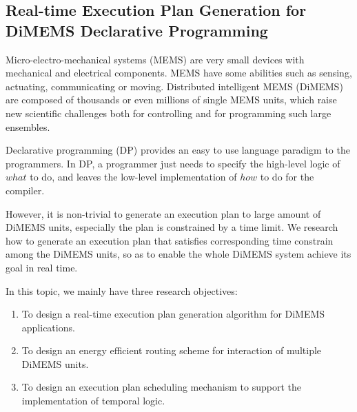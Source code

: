 
\subsection{Real-time Execution Plan Generation for DiMEMS Declarative Programming}

Micro-electro-mechanical systems (MEMS) are very small devices with mechanical and electrical components. MEMS have some abilities such as sensing, actuating, communicating or moving. Distributed intelligent MEMS (DiMEMS) are composed of thousands
or even millions of single MEMS units, which raise new
scientific challenges both for controlling and for programming
such large ensembles.

Declarative programming (DP) provides an easy to use language paradigm to the programmers.
In DP, a programmer just needs to specify the high-level logic of $what$ to do, and
leaves the low-level implementation of $how$ to do for the compiler.

However, it is non-trivial to generate an execution plan to large amount of DiMEMS units, especially
the plan is constrained by a time limit. We research how to generate an execution plan that satisfies corresponding time constrain among the DiMEMS
units, so as to enable the whole DiMEMS system achieve its goal in real time.

In this topic, we mainly have three research objectives:

\begin{enumerate}
  \item To design a real-time execution plan generation algorithm for DiMEMS applications.
  \item To design an energy efficient routing scheme for interaction of multiple DiMEMS units.
  \item To design an execution plan scheduling mechanism to support the implementation of temporal logic.
\end{enumerate}




